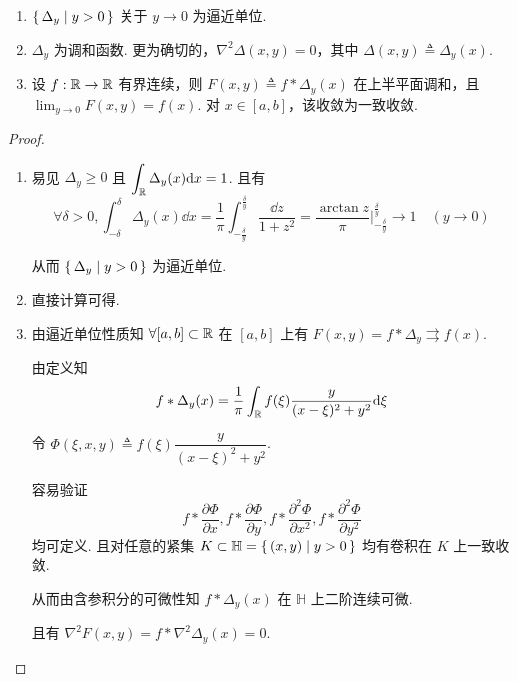 \begin{property}
    \begin{enumerate}
        \item $\set{\Delta_y|y>0}$ 关于 $y\to 0$ 为逼近单位.
        
        \item $\Delta_y$ 为调和函数. 更为确切的，$\nabla^2\Delta(x,y)=0$，其中 $\Delta(x,y)\triangleq\Delta_y(x)$.
        
        \item 设 $f:\mathbb{R}\to\mathbb{R}$ 有界连续，则 $F(x,y)\triangleq f*\Delta_y(x)$ 在上半平面调和，且 $\displaystyle\lim_{y\to 0}F(x,y)=f(x)$. 对 $x\in[a,b]$，该收敛为一致收敛.
    \end{enumerate}
\end{property}
\begin{proof}
    \begin{enumerate}
        \item 易见 $\Delta_y\ge 0$ 且 $\displaystyle\int_{\mathbb{R}}\Delta_y(x)\mathrm{d} x=1$. 且有
$$
\forall\delta>0,\int_{-\delta}^\delta\Delta_y(x)\dd x=\frac{1}{\pi}\int_{-\frac{\delta}{y}}^{\frac{\delta}{y}}\frac{\dd z}{1+z^2}=\frac{\arctan z}{\pi}\Bigg|_{-\frac{\delta}{y}}^{\frac{\delta}{y}}\to 1\quad(y\to 0)
$$
        
        从而 $\set{\Delta_y|y>0}$ 为逼近单位.

        \item 直接计算可得.
        
        \item 由逼近单位性质知 $\forall[a,b]\subset\mathbb{R}$ 在 $[a,b]$ 上有 $F(x,y)=f*\Delta_y\rightrightarrows f(x)$.
        
        由定义知
$$
f*\Delta_y(x)=\frac{1}{\pi}\int_{\mathbb{R}} f(\xi)\frac{y}{(x-\xi)^2+y^2}\mathrm{d}\xi
$$

        令 $\Phi(\xi,x,y)\triangleq f(\xi)\dfrac{y}{(x-\xi)^2+y^2}$.

        容易验证
$$
f*\dfrac{\partial\Phi}{\partial x},f*\dfrac{\partial\Phi}{\partial y},f*\dfrac{\partial^2\Phi}{\partial x^2},f*\dfrac{\partial^2\Phi}{\partial y^2}
$$
        均可定义. 且对任意的紧集 $K\subset\mathbb{H}=\set{(x,y)|y>0}$ 均有卷积在 $K$ 上一致收敛.

        从而由含参积分的可微性知 $f*\Delta_y(x)$ 在 $\mathbb{H}$ 上二阶连续可微.
        
        且有 $\nabla^2F(x,y)=f*\nabla^2\Delta_y(x)=0$.
    \end{enumerate}
\end{proof}

